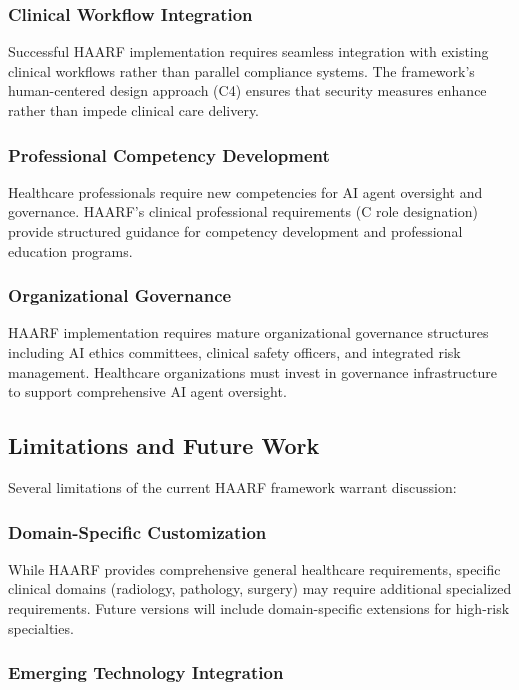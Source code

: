 \documentclass[11pt]{article}
\begin{document}
\subsubsection{Clinical Workflow Integration}

Successful HAARF implementation requires seamless integration with existing clinical workflows rather than parallel compliance systems. The framework's human-centered design approach (C4) ensures that security measures enhance rather than impede clinical care delivery.

\subsubsection{Professional Competency Development}

Healthcare professionals require new competencies for AI agent oversight and governance. HAARF's clinical professional requirements (C role designation) provide structured guidance for competency development and professional education programs.

\subsubsection{Organizational Governance}

HAARF implementation requires mature organizational governance structures including AI ethics committees, clinical safety officers, and integrated risk management. Healthcare organizations must invest in governance infrastructure to support comprehensive AI agent oversight.

\subsection{Limitations and Future Work}

Several limitations of the current HAARF framework warrant discussion:

\subsubsection{Domain-Specific Customization}

While HAARF provides comprehensive general healthcare requirements, specific clinical domains (radiology, pathology, surgery) may require additional specialized requirements. Future versions will include domain-specific extensions for high-risk specialties.

\subsubsection{Emerging Technology Integration}
\end{document}
